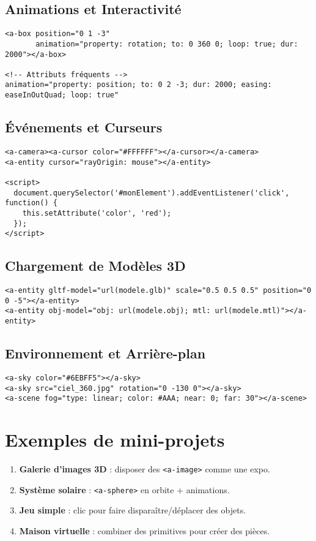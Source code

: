 \documentclass[12pt]{article}
\begin{document}
\subsection{Animations et Interactivité}
\begin{verbatim}
<a-box position="0 1 -3"
       animation="property: rotation; to: 0 360 0; loop: true; dur: 2000"></a-box>

<!-- Attributs fréquents -->
animation="property: position; to: 0 2 -3; dur: 2000; easing: easeInOutQuad; loop: true"
\end{verbatim}

\subsection{Événements et Curseurs}
\begin{verbatim}
<a-camera><a-cursor color="#FFFFFF"></a-cursor></a-camera>
<a-entity cursor="rayOrigin: mouse"></a-entity>

<script>
  document.querySelector('#monElement').addEventListener('click', function() {
    this.setAttribute('color', 'red');
  });
</script>
\end{verbatim}

\subsection{Chargement de Modèles 3D}
\begin{verbatim}
<a-entity gltf-model="url(modele.glb)" scale="0.5 0.5 0.5" position="0 0 -5"></a-entity>
<a-entity obj-model="obj: url(modele.obj); mtl: url(modele.mtl)"></a-entity>
\end{verbatim}

\subsection{Environnement et Arrière-plan}
\begin{verbatim}
<a-sky color="#6EBFF5"></a-sky>
<a-sky src="ciel_360.jpg" rotation="0 -130 0"></a-sky>
<a-scene fog="type: linear; color: #AAA; near: 0; far: 30"></a-scene>
\end{verbatim}

\section{Exemples de mini-projets}
\begin{enumerate}
    \item \textbf{Galerie d'images 3D} : disposer des \texttt{<a-image>} comme une expo.
    \item \textbf{Système solaire} : \texttt{<a-sphere>} en orbite + animations.
    \item \textbf{Jeu simple} : clic pour faire disparaître/déplacer des objets.
    \item \textbf{Maison virtuelle} : combiner des primitives pour créer des pièces.
\end{enumerate}
\end{document}

